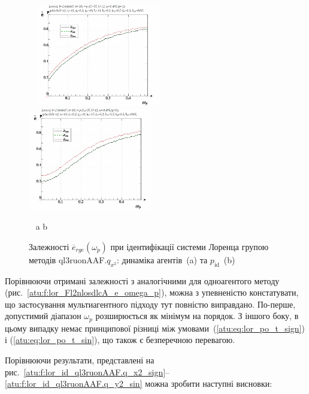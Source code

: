 \begin{figure}[ht!]
  \begin{center}
    ~ \hfill
    \includegraphics[width=0.49\textwidth]{p/cha/lor/ql3ruonAAF/lor_ql3ruonAAF_qx2-p_omega_p_e_sign.png}
    \hfill
    \includegraphics[width=0.49\textwidth]{p/cha/lor/ql3ruonAAF/lor_ql3ruonAAF_qx2-p_omega_p_e_sin.png}
    \hfill ~
  \end{center}
  \vspace{-1.0ex}
  \begin{center}
    ~ \hfill a \hfill\hfill b \hfill ~
  \end{center}
  \vspace{-1.5ex}
  \caption{Залежності $ \overline{e}_{rge} (\omega_p) $ при ідентифікації системи Лоренца групою методів ql3ruonAAF.$q_{x^2} $: динаміка агентів~(a) та $p_\mathrm{id}$~(b)}
\label{atu:f:lor_ql3ruonAAF_e_omega_p}
\end{figure}

Порівнюючи отримані залежності з аналогічними для
одноагентого методу (рис.~\ref{atu:f:lor_Fl2nlosdlcA_e_omega_p}), можна з
упевненістю констатувати, що застосування мультиагентного
підходу тут повністю виправдано. По-перше, допустимий діапазон
$ \omega_p $ розширюється як мінімум на порядок. З іншого боку, в цьому
випадку немає принципової різниці між умовами~(\ref{atu:eq:lor_po_t_sign})
і (\ref{atu:eq:lor_po_t_sin}), що також є безперечною перевагою.




Порівнюючи результати, представлені на
рис.~\ref{atu:f:lor_id_ql3ruonAAF.q_x2_sign}--\ref{atu:f:lor_id_ql3ruonAAF.q_y2_sin} можна зробити
наступні висновки:

